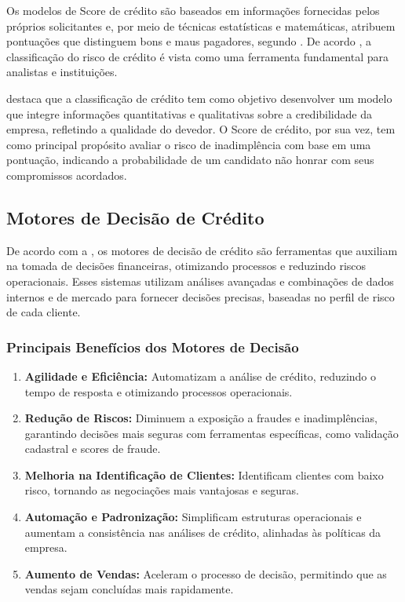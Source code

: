 \documentclass[12pt,a4paper]{article}
\begin{document}
Os modelos de Score de crédito são baseados em informações fornecidas pelos próprios solicitantes e, por meio de técnicas estatísticas e matemáticas, atribuem pontuações que distinguem bons e maus pagadores, segundo \cite{beserra2022}. De acordo \cite{francisco2012}, a classificação do risco de crédito é vista como uma ferramenta fundamental para analistas e instituições.

\cite{fuhr2022} destaca que a classificação de crédito tem como objetivo desenvolver um modelo que integre informações quantitativas e qualitativas sobre a credibilidade da empresa, refletindo a qualidade do devedor. O Score de crédito, por sua vez, tem como principal propósito avaliar o risco de inadimplência com base em uma pontuação, indicando a probabilidade de um candidato não honrar com seus compromissos acordados.

\subsection{Motores de Decisão de Crédito}

De acordo com a \cite{serasa2024}, os motores de decisão de crédito são ferramentas que auxiliam na tomada de decisões financeiras, otimizando processos e reduzindo riscos operacionais. Esses sistemas utilizam análises avançadas e combinações de dados internos e de mercado para fornecer decisões precisas, baseadas no perfil de risco de cada cliente.

\subsubsection{Principais Benefícios dos Motores de Decisão}

\begin{enumerate}
    \item \textbf{Agilidade e Eficiência:} Automatizam a análise de crédito, reduzindo o tempo de resposta e otimizando processos operacionais.
    \item \textbf{Redução de Riscos:} Diminuem a exposição a fraudes e inadimplências, garantindo decisões mais seguras com ferramentas específicas, como validação cadastral e scores de fraude.
    \item \textbf{Melhoria na Identificação de Clientes:} Identificam clientes com baixo risco, tornando as negociações mais vantajosas e seguras.
    \item \textbf{Automação e Padronização:} Simplificam estruturas operacionais e aumentam a consistência nas análises de crédito, alinhadas às políticas da empresa.
    \item \textbf{Aumento de Vendas:} Aceleram o processo de decisão, permitindo que as vendas sejam concluídas mais rapidamente.
\end{enumerate}
\end{document}
